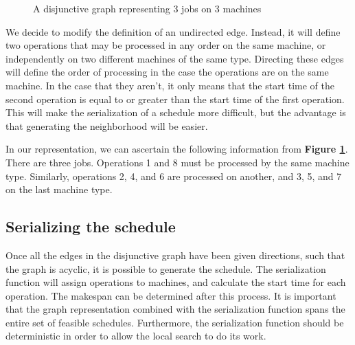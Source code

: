 \documentclass[a4paper,10pt]{article}
\begin{document}
\begin{figure}[h]
\centering
{}
\caption{A disjunctive graph representing 3 jobs on 3 machines}
\label{fig:disjunctivegraph}
\end{figure}

We decide to modify the definition of an undirected edge. Instead, it will define two operations that may be processed in any order on the same machine, or independently on two different machines of the same type. Directing these edges will define the order of processing in the case the operations are on the same machine. In the case that they aren't, it only means that the start time of the second operation is equal to or greater than the start time of the first operation. This will make the serialization of a schedule more difficult, but the advantage is that generating the neighborhood will be easier.

In our representation, we can ascertain the following information from \textbf{Figure \ref{fig:disjunctivegraph}}. There are three jobs. Operations 1 and 8 must be processed by the same machine type. Similarly, operations 2, 4, and 6 are processed on another, and 3, 5, and 7 on the last machine type.

\subsection{Serializing the schedule}

Once all the edges in the disjunctive graph have been given directions, such that the graph is acyclic, it is possible to generate the schedule. The serialization function will assign operations to machines, and calculate the start time for each operation. The makespan can be determined after this process. It is important that the graph representation combined with the serialization function spans the entire set of feasible schedules. Furthermore, the serialization function should be deterministic in order to allow the local search to do its work.
\end{document}

